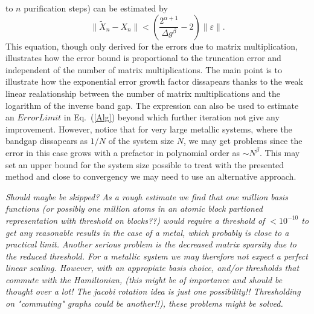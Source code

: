 \commentoutA{\documentclass[superbib,aps,prb,epsfig,floats,twocolumn]{revtex4}}
\begin{document}
to $n$ purification steps) can be estimated by
\begin{equation}
\| {\widetilde X}_n - X_n \| < 
\left( \frac{2^{\alpha+1}}{\Delta g ^{\beta}} - 2 \right) \|\varepsilon\|.
\end{equation}
This equation, though only derived for the errors due to matrix multiplication, 
illustrates how the error bound is proportional to the truncation error and
independent of the number of matrix multiplications. The main
point is to illustrate how the exponential error growth factor dissapears
thanks to the weak linear realationship between the number
of matrix multiplications and the logarithm of the inverse band gap.
The expression can also be used to estimate an $ErrorLimit$ in Eq.\ (\ref{Alg})
beyond which further iteration not give any improvement.
However, notice that for very large metallic systems, where the
bandgap dissapears as $1/N$ of the system size $N$, we 
may get problems since the error in this case grows with 
a prefactor in polynomial order as $\sim N^{\beta}$.
This may set an upper bound for the system size possible to
treat with the presented method and close to convergency we may
need to use an alternative approach. 

{\it Should maybe be skipped? As a rough estimate we
find that one million basis functions (or possibly one million 
atoms in an atomic block partioned representation with threshold on blocks??)
would require a threshold of $< 10^{-10}$ to get any 
reasonable results in the case of a metal, which probably 
is close to a practical limit. Another serious problem is
the decreased matrix sparsity due to the reduced threshold.
For a metallic system we may therefore not expect a perfect
linear scaling. However, with an appropiate basis choice,
and/or thresholds that commute with the Hamiltonian,
(this might be of importance and should be thought over a lot!
The jacobi rotation idea is just one possibility!!
Thresholding on "commuting" graphs could be another!!),
these problems might be solved.}
\end{document}
